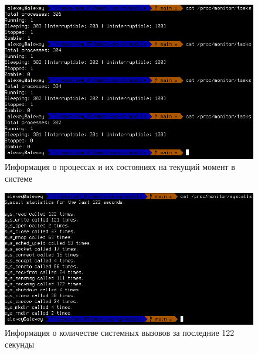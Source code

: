 \begin{figure}[h!]
	\begin{center}
		\includegraphics[scale=0.6]{img/tasks_example.png}
	\end{center}
	\captionsetup{justification=centering}
	\caption{Информация о процессах и их состояниях на текущий момент в системе}
	\label{img:tasks_example}
\end{figure}

\begin{figure}[h!]
	\begin{center}
		\includegraphics[scale=0.6]{img/syscalls_example_01.png}
	\end{center}
	\captionsetup{justification=centering}
	\caption{Информация о количестве системных вызовов за последние 122 секунды}
	\label{img:syscalls_example_01}
\end{figure}

